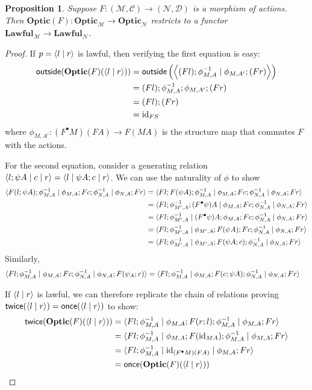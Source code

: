 \documentclass[11pt,letterpaper]{article}
\theoremstyle{plain}
\newtheorem{proposition}[theorem]{Proposition}
\theoremstyle{definition}
\newcommand{\C}{\mathscr{C}}
\newcommand{\D}{\mathscr{D}}
\newcommand{\M}{\mathscr{M}}
\newcommand{\N}{\mathscr{N}}
\newcommand{\Optic}{\mathbf{Optic}}
\newcommand{\Lawful}{\mathbf{Lawful}}
\newcommand{\id}{\mathrm{id}}
\newcommand{\rep}[2]{{\ensuremath \left\langle #1 \mid #2 \right\rangle}}
\newcommand{\repthree}[3]{{\ensuremath \langle #1 \mid #2 \mid #3 \rangle}}
\newcommand{\outside}{\mathsf{outside}}
\newcommand{\once}{\mathsf{once}}
\newcommand{\twice}{\mathsf{twice}}
\begin{document}
\begin{proposition}
  Suppose $F : (\M, \C) \to (\N, \D)$ is a morphism of actions. Then $\Optic(F) : \Optic_\M \to \Optic_\N$ restricts to a functor $\Lawful_\M \to \Lawful_\N$.
\end{proposition}
\begin{proof}
  If $p = \rep{l}{r}$ is lawful, then verifying the first equation is easy:
  \begin{align*}
  \outside(\Optic(F)(\rep{l}{r}))
  &= \outside\left(\rep{(Fl);\phi^{-1}_{M,A}}{\phi_{M,A'};(Fr)}\right) \\
  &= (Fl);\phi^{-1}_{M,A};\phi_{M,A'};(Fr)\\
  &= (Fl);(Fr)\\
  &= \id_{FS}
  \end{align*}
  where $\phi_{M,A'} : (F^\bullet M)(FA) \to F(MA)$ is the structure map that commutes $F$ with the actions.

  For the second equation, consider a generating relation $\repthree{l;\psi A}{c}{r} = \repthree{l}{\psi A ; c}{r}$. We can use the naturality of $\phi$ to show
  \begin{align*}
  \repthree{F(l;\psi A);\phi^{-1}_{M,A}}{\phi_{M,A};Fc;\phi^{-1}_{N,A}}{\phi_{N,A};Fr}
  &= \repthree{Fl;F(\psi A);\phi^{-1}_{M,A}}{\phi_{M,A};Fc;\phi^{-1}_{N,A}}{\phi_{N,A};Fr} \\
  &= \repthree{Fl;\phi^{-1}_{M',A};(F^\bullet \psi) A}{\phi_{M,A};Fc;\phi^{-1}_{N,A}}{\phi_{N,A};Fr} \\
  &= \repthree{Fl;\phi^{-1}_{M',A}}{(F^\bullet \psi) A;\phi_{M,A};Fc;\phi^{-1}_{N,A}}{\phi_{N,A};Fr} \\
  &= \repthree{Fl;\phi^{-1}_{M',A}}{\phi_{M',A};F(\psi A);Fc;\phi^{-1}_{N,A}}{\phi_{N,A};Fr} \\
  &= \repthree{Fl;\phi^{-1}_{M',A}}{\phi_{M',A};F(\psi A;c);\phi^{-1}_{N,A}}{\phi_{N,A};Fr}
  \end{align*}
  Similarly,
  \begin{align*}
    \repthree{Fl;\phi^{-1}_{M,A}}{\phi_{M,A};Fc;\phi^{-1}_{N,A}}{\phi_{N,A};F(\psi_A;r)}
    &= \repthree{Fl;\phi^{-1}_{M,A}}{\phi_{M,A};F(c;\psi A);\phi^{-1}_{N,A}}{\phi_{N,A};Fr}
  \end{align*}

  If $\rep{l}{r}$ is lawful, we can therefore replicate the chain of relations proving $\twice(\rep{l}{r}) = \once(\rep{l}{r})$ to show:
  \begin{align*}
  \twice(\Optic(F)(\rep{l}{r}))
  &= \repthree{Fl;\phi^{-1}_{M,A}}{\phi_{M,A};F(r;l);\phi^{-1}_{M,A}}{\phi_{M,A};Fr}  \\
  &= \repthree{Fl;\phi^{-1}_{M,A}}{\phi_{M,A};F(\id_{MA});\phi^{-1}_{M,A}}{\phi_{M,A};Fr}  \\
  &= \repthree{Fl;\phi^{-1}_{M,A}}{\id_{(F^\bullet M)(FA)}}{\phi_{M,A};Fr}  \\
  &= \once(\Optic(F)(\rep{l}{r}))
  \end{align*}
\end{proof}
\end{document}
